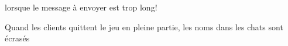 
\begin{DoxyRefList}
\item[Global \mbox{\hyperlink{server_8c_a9cf4c7aa19d28eb76c9635b2267df762}{broadcast\+Message}} (char $\ast$mess)]\label{bug__bug000001}%
%
lorsque le message à envoyer est trop long!  
\item[Global \mbox{\hyperlink{server_8c_a0ddf1224851353fc92bfbff6f499fa97}{main}} (int argc, char $\ast$argv\mbox{[}\mbox{]})]\label{bug__bug000002}%
%
Quand les clients quittent le jeu en pleine partie, les noms dans les chats sont écrasés 
\end{DoxyRefList}